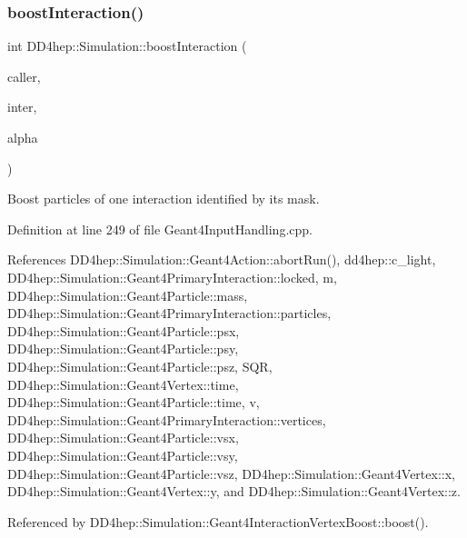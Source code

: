 \subsubsection{\texorpdfstring{boost\+Interaction()}{boostInteraction()}}
{\footnotesize\ttfamily int D\+D4hep\+::\+Simulation\+::boost\+Interaction (\begin{DoxyParamCaption}\item[{const \hyperlink{class_d_d4hep_1_1_simulation_1_1_geant4_action}{Geant4\+Action} $\ast$}]{caller,  }\item[{\hyperlink{class_d_d4hep_1_1_simulation_1_1_geant4_primary_event_afe42410b9331b521808a49120f402bd9}{Geant4\+Primary\+Event\+::\+Interaction} $\ast$}]{inter,  }\item[{double}]{alpha }\end{DoxyParamCaption})}



Boost particles of one interaction identified by its mask. 



Definition at line 249 of file Geant4\+Input\+Handling.\+cpp.



References D\+D4hep\+::\+Simulation\+::\+Geant4\+Action\+::abort\+Run(), dd4hep\+::c\+\_\+light, D\+D4hep\+::\+Simulation\+::\+Geant4\+Primary\+Interaction\+::locked, m, D\+D4hep\+::\+Simulation\+::\+Geant4\+Particle\+::mass, D\+D4hep\+::\+Simulation\+::\+Geant4\+Primary\+Interaction\+::particles, D\+D4hep\+::\+Simulation\+::\+Geant4\+Particle\+::psx, D\+D4hep\+::\+Simulation\+::\+Geant4\+Particle\+::psy, D\+D4hep\+::\+Simulation\+::\+Geant4\+Particle\+::psz, S\+QR, D\+D4hep\+::\+Simulation\+::\+Geant4\+Vertex\+::time, D\+D4hep\+::\+Simulation\+::\+Geant4\+Particle\+::time, v, D\+D4hep\+::\+Simulation\+::\+Geant4\+Primary\+Interaction\+::vertices, D\+D4hep\+::\+Simulation\+::\+Geant4\+Particle\+::vsx, D\+D4hep\+::\+Simulation\+::\+Geant4\+Particle\+::vsy, D\+D4hep\+::\+Simulation\+::\+Geant4\+Particle\+::vsz, D\+D4hep\+::\+Simulation\+::\+Geant4\+Vertex\+::x, D\+D4hep\+::\+Simulation\+::\+Geant4\+Vertex\+::y, and D\+D4hep\+::\+Simulation\+::\+Geant4\+Vertex\+::z.



Referenced by D\+D4hep\+::\+Simulation\+::\+Geant4\+Interaction\+Vertex\+Boost\+::boost().

\hypertarget{namespace_d_d4hep_1_1_simulation_a4ac1b304fa5fccd459ed303474641342}{}\label{namespace_d_d4hep_1_1_simulation_a4ac1b304fa5fccd459ed303474641342} 
